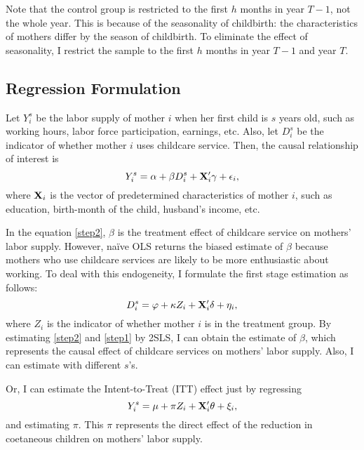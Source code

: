 \documentclass[12pt]{article}
\begin{document}
Note that the control group is restricted to the first $h$ months in year $T-1$, not the whole year.
This is because of the seasonality of childbirth: the characteristics of mothers differ by the season of childbirth\cite{Buckles2013-tj}. 
To eliminate the effect of seasonality, I restrict the sample to the first $h$ months in year $T-1$ and year $T$.

\subsection*{Regression Formulation}
Let $Y_i^s$ be the labor supply of mother $i$ when her first child is $s$ years old, such as working hours, labor force participation, earnings, etc.
Also, let $D_i^s$ be the indicator of whether mother $i$ uses childcare service. 
Then, the causal relationship of interest is 
\begin{equation}
  Y_i^s = \alpha + \beta D_i^s + \vb{X}_i'\vb{\gamma} + \epsilon_i, \label{step2}
\end{equation}
where $\vb{X}_i$ is the vector of predetermined characteristics of mother $i$, such as education, birth-month of the child, husband's income, etc.


In the equation \eqref{step2}, $\beta$ is the treatment effect of childcare service on mothers' labor supply.
However, na\"ive OLS returns the biased estimate of $\beta$ because mothers who use childcare services are likely to be more enthusiastic about working.
To deal with this endogeneity, I formulate the first stage estimation as follows:
\begin{equation}
  D_i^s = \varphi + \kappa Z_i + \vb{X}_i'\vb{\delta} + \eta_i, \label{step1}
\end{equation}
where $Z_i$ is the indicator of whether mother $i$ is in the treatment group.
By estimating \eqref{step2} and \eqref{step1} by 2SLS, I can obtain the estimate of $\beta$, which represents the causal effect of childcare services on mothers' labor supply.
Also, I can estimate with different $s$'s. 


Or, I can estimate the Intent-to-Treat (ITT) effect just by regressing 
\begin{equation}
  Y_i^s = \mu + \pi Z_i + \vb{X}_i'\vb{\theta} + \xi_i, \label{ITT}
\end{equation}
and estimating $\pi$.
This $\pi$ represents the direct effect of the reduction in coetaneous children on mothers' labor supply.
\end{document}
